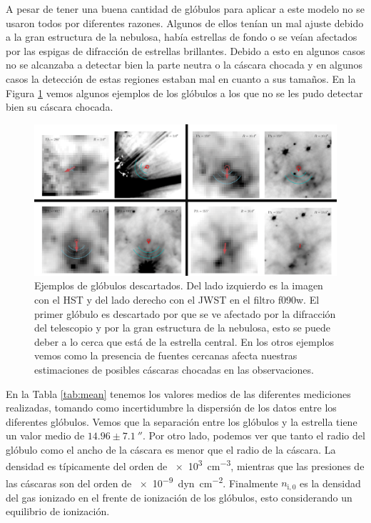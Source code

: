 \documentclass{book}
\begin{document}
A pesar de tener una buena cantidad de glóbulos para aplicar a este modelo no se usaron todos por diferentes razones. 
Algunos de ellos tenían un mal ajuste debido a la gran estructura de la nebulosa, había estrellas de fondo o se veían afectados por las espigas de difracción de estrellas brillantes.  Debido a esto en algunos casos no se alcanzaba a detectar bien la parte neutra o la cáscara chocada y en algunos casos la detección de estas regiones estaban mal en cuanto a sus tamaños. En la Figura \ref{Bad Globules} vemos algunos ejemplos de los glóbulos a los que no se les pudo detectar bien su cáscara chocada.\\

\begin{figure}[htb]
    \centering
    \includegraphics[width=\textwidth]{Nuevas imagenes finales/Malos_ajustes_final.pdf}
    \caption{Ejemplos de glóbulos descartados. Del lado izquierdo es la imagen con el HST y del lado derecho con el JWST en el filtro f090w. El primer glóbulo es descartado por que se ve afectado por la difracción del telescopio y por la gran estructura de la nebulosa, esto se puede deber a lo cerca que está de la estrella central. En los otros ejemplos vemos como la presencia de fuentes cercanas afecta nuestras estimaciones de posibles cáscaras chocadas en las observaciones.}
    \label{Bad Globules}
\end{figure}

En la Tabla \ref{tab:mean} tenemos los valores medios de las diferentes mediciones realizadas, tomando como incertidumbre la dispersión de los datos entre los diferentes glóbulos. Vemos que la separación entre los glóbulos y la estrella tiene un valor medio de $14.96\pm\SI{7.1}{\arcsecond}$. Por otro lado, podemos ver que tanto el radio del glóbulo como el ancho de la cáscara es menor que el radio de la cáscara. La densidad es típicamente del orden de \SI{e3}{cm^{-3}}, mientras que las presiones de las cáscaras son del orden de \SI{e-9}{dyn.cm^{-2}}. Finalmente $n_\mathrm{i,0}$ es la densidad del gas ionizado en el frente de ionización de los glóbulos,  esto considerando un equilibrio de ionización.
\end{document}
